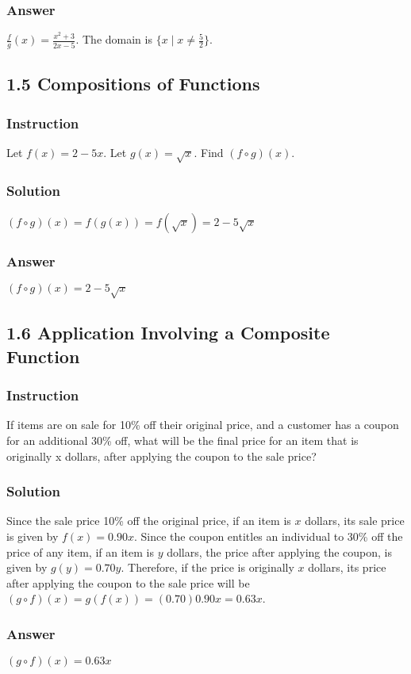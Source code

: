 \documentclass[12pt, letterpaper, oneside]{memoir}
\begin{document}
\subsubsection{Answer}

$ \frac{f}{g}(x) = \frac{x^2 + 3}{2x - 5} $. The domain is $ \{ x \mid x \ne \frac{5}{2} \} $.

\subsection*{1.5 Compositions of Functions}

\subsubsection{Instruction}

Let $ f(x) = 2 - 5x $. Let $ g(x) = \sqrt{x} $. Find $ (f \circ g)(x) $.

\subsubsection{Solution}

$ (f \circ g)(x) = f(g(x)) = f(\sqrt{x}) = 2 - 5\sqrt{x} $

\subsubsection{Answer}

$ (f \circ g)(x) = 2 - 5\sqrt{x} $

\subsection*{1.6 Application Involving a Composite Function}

\subsubsection{Instruction}

If items are on sale for 10\% off their original price, and a customer has a coupon for an additional 30\% off, what will be the final price for an item that is originally x dollars, after applying the coupon to the sale price?

\subsubsection{Solution}

Since the sale price 10\% off the original price, if an item is $ x $ dollars, its sale price is given by $ f(x) = 0.90x $. Since the coupon entitles an individual to 30\% off the price of any item, if an item is $ y $ dollars, the price after applying the coupon, is given by $ g(y) = 0.70y $. Therefore, if the price is originally $ x $ dollars, its price after applying the coupon to the sale price will be $ (g \circ f)(x) = g(f(x)) = (0.70)0.90x = 0.63x $.

\subsubsection{Answer}

$ (g \circ f)(x) = 0.63x $
\end{document}
